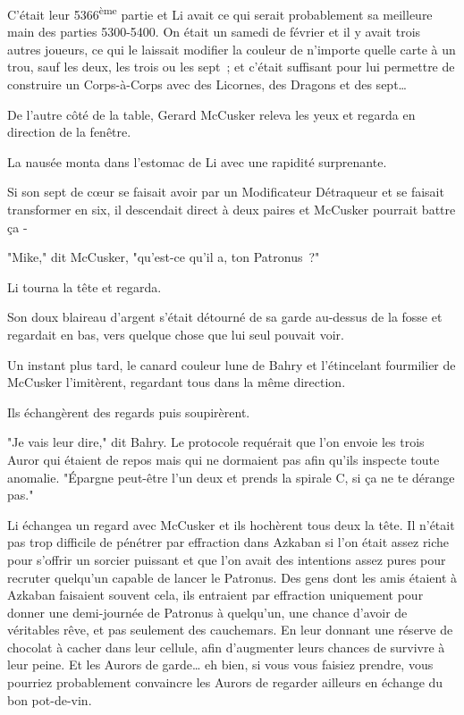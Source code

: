 C'était leur 5366\textsuperscript{ème} partie et Li avait ce qui serait probablement sa meilleure main des parties 5300-5400. On était un samedi de février et il y avait trois autres joueurs, ce qui le laissait modifier la couleur de n'importe quelle carte à un trou, sauf les deux, les trois ou les sept~; et c'était suffisant pour lui permettre de construire un Corps-à-Corps avec des Licornes, des Dragons et des sept…

De l'autre côté de la table, Gerard McCusker releva les yeux et regarda en direction de la fenêtre.

La nausée monta dans l'estomac de Li avec une rapidité surprenante.

Si son sept de cœur se faisait avoir par un Modificateur Détraqueur et se faisait transformer en six, il descendait direct à deux paires et McCusker pourrait battre ça -

"Mike," dit McCusker, "qu'est-ce qu'il a, ton Patronus~?"

Li tourna la tête et regarda.

Son doux blaireau d'argent s'était détourné de sa garde au-dessus de la fosse et regardait en bas, vers quelque chose que lui seul pouvait voir.

Un instant plus tard, le canard couleur lune de Bahry et l'étincelant fourmilier de McCusker l'imitèrent, regardant tous dans la même direction.

Ils échangèrent des regards puis soupirèrent.

"Je vais leur dire," dit Bahry. Le protocole requérait que l'on envoie les trois Auror qui étaient de repos mais qui ne dormaient pas afin qu'ils inspecte toute anomalie. "Épargne peut-être l'un deux et prends la spirale C, si ça ne te dérange pas."

Li échangea un regard avec McCusker et ils hochèrent tous deux la tête. Il n'était pas trop difficile de pénétrer par effraction dans Azkaban si l'on était assez riche pour s'offrir un sorcier puissant et que l'on avait des intentions assez pures pour recruter quelqu'un capable de lancer le Patronus. Des gens dont les amis étaient à Azkaban faisaient souvent cela, ils entraient par effraction uniquement pour donner une demi-journée de Patronus à quelqu'un, une chance d'avoir de véritables rêve, et pas seulement des cauchemars. En leur donnant une réserve de chocolat à cacher dans leur cellule, afin d'augmenter leurs chances de survivre à leur peine. Et les Aurors de garde… eh bien, si vous vous faisiez prendre, vous pourriez probablement convaincre les Aurors de regarder ailleurs en échange du bon pot-de-vin.

